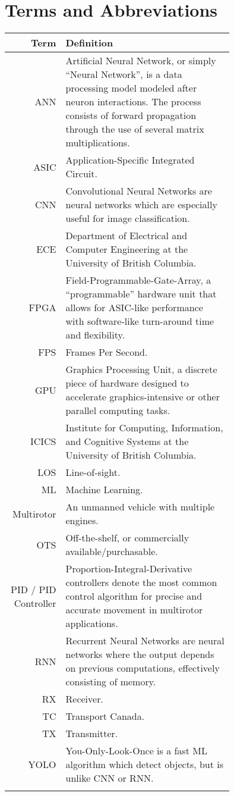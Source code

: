 \thispagestyle{empty}

\section*{Terms and Abbreviations}

\begin{tabular}[h]{rp{0.75\linewidth}}
    \hline
    \textbf{Term} & \textbf{Definition}\\
    \hline

    ANN & Artificial Neural Network, or simply ``Neural Network'', is a data processing model modeled after neuron interactions. The process consists of forward propagation through the use of several matrix multiplications.\cite{ann}\\
    ASIC & Application-Specific Integrated Circuit.\\
    CNN & Convolutional Neural Networks are neural networks which are especially useful for image classification.\cite{cnn} \\
    ECE & Department of Electrical and Computer Engineering at the University of British Columbia.\\
    FPGA & Field-Programmable-Gate-Array, a ``programmable'' hardware unit that allows for ASIC-like performance with software-like turn-around time and flexibility.\\
    FPS & Frames Per Second.\\
    GPU & Graphics Processing Unit, a discrete piece of hardware designed to accelerate graphics-intensive or other parallel computing tasks.\\
	ICICS & Institute for Computing, Information, and Cognitive Systems at the University of British Columbia.\\
    LOS & Line-of-sight.\\
    ML & Machine Learning.\\
    Multirotor & An unmanned vehicle with multiple engines. \\
    OTS & Off-the-shelf, or commercially available/purchasable. \\
    PID / PID Controller & Proportion-Integral-Derivative controllers denote the most common control algorithm for precise and accurate movement in multirotor applications.\cite{pid}\\
    RNN & Recurrent Neural Networks are neural networks where the output depends on previous computations, effectively consisting of memory.\cite{rnn}\\
    RX & Receiver.\\
    TC & Transport Canada.\\
    TX & Transmitter.\\
    YOLO & You-Only-Look-Once is a fast ML algorithm which detect objects, but is unlike CNN or RNN.\cite{yolo}\cite{yolo-2}\\
     & \\

    \hline

\end{tabular}
